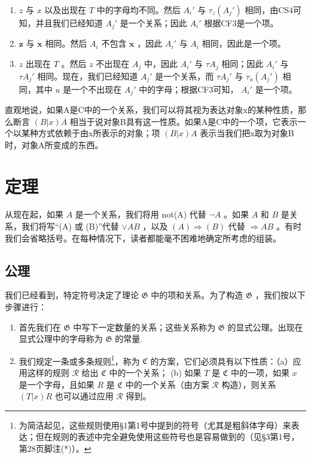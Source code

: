 \begin{enumerate}
\def\labelenumi{(\alph{enumi})}
\item
  \(z\) 与 \(x\) 以及出现在 \(T\) 中的字母均不同。然后 \(A_i'\) 与 \(\tau_z(A_j')\) 相同，由CS4可知，并且我们已经知道 \(A_j'\) 是一个关系；因此 \(A_i'\) 根据CF3是一个项。
\item
  \(\pmb{z}\) 与 \(\pmb{x}\) 相同。然后 \(A_{i}\) 不包含 \(\pmb{x}\) ，因此 \(A_{i}'\) 与 \(A_{i}\) 相同，因此是一个项。
\item
  \(z\) 出现在 \(T\) 。然后 \(z\) 不出现在 \(A_j\) 中，因此 \(A_i'\) 与 \(\tau A_j\) 相同；因此 \(A_i'\) 与 \(\tau A_j'\) 相同。现在，我们已经知道 \(A_j'\) 是一个关系，而 \(\tau A_j'\) 与 \(\tau_u(A_j')\) 相同，其中 \(u\) 是一个不出现在 \(A_j'\) 中的字母；根据CF3可知， \(A_i'\) 是一个项。
\end{enumerate}

直观地说，如果A是C中的一个关系，我们可以将其视为表达对象x的某种性质，那么断言 \((B|x)A\) 相当于说对象B具有这一性质。如果A是C中的一个项，它表示一个以某种方式依赖于由x所表示的对象；项 \((B|x)A\) 表示当我们把x取为对象B时，对象A所变成的东西。

\section{定理}

从现在起，如果 \(A\) 是一个关系，我们将用 not(A) 代替 \(\neg A\) 。如果 \(A\) 和 \(B\) 是关系，我们将写“(A) 或 (B)”代替 \(\vee AB\) ，以及 \((A) \Longrightarrow (B)\) 代替 \(\Longrightarrow AB\) 。有时我们会省略括号。在每种情况下，读者都能毫不困难地确定所考虑的组装。

\subsection{公理}

我们已经看到，特定符号决定了理论 \(\mathfrak{G}\) 中的项和关系。为了构造 \(\mathfrak{G}\) ，我们按以下步骤进行：

\begin{enumerate}
\def\labelenumi{(\arabic{enumi})}
\item
  首先我们在 \(\mathfrak{G}\) 中写下一定数量的关系；这些关系称为 \(\mathfrak{G}\) 的显式公理。出现在显式公理中的字母称为 \(\mathfrak{G}\) 的常量.
\item
  我们规定一条或多条规则\footnote{为简洁起见，这些规则使用§1第1号中提到的符号（尤其是粗斜体字母）来表达；但在规则的表述中完全避免使用这些符号也是容易做到的（见§3第1号，第28页脚注(*)）。}，称为 \(\mathfrak{C}\) 的方案，它们必须具有以下性质：（a）应用这样的规则 \(\mathcal{R}\) 给出 \(\mathfrak{C}\) 中的一个关系； (b) 如果 \(T\) 是 \(\mathfrak{C}\) 中的一项，如果 \(x\) 是一个字母，且如果 \(R\) 是 \(\mathfrak{C}\) 中的一个关系（由方案 \(\mathcal{R}\) 构造），则关系 \((T|x)R\) 也可以通过应用 \(\mathcal{R}\) 得到。
\end{enumerate}

